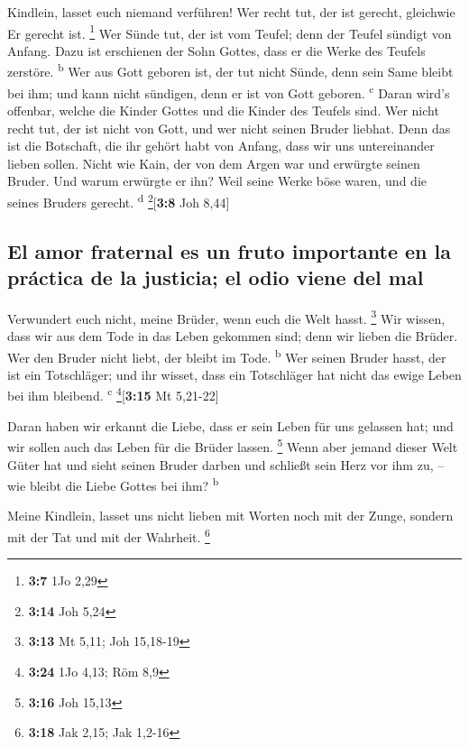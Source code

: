  Kindlein, lasset euch niemand verführen! Wer recht tut,
der ist gerecht, gleichwie Er gerecht ist. \footnote{\textbf{3:7} 1Jo
  2,29}  Wer Sünde tut, der ist vom Teufel; denn der
Teufel sündigt von Anfang. Dazu ist erschienen der Sohn Gottes, dass er
die Werke des Teufels zerstöre. \textsuperscript{b}  Wer
aus Gott geboren ist, der tut nicht Sünde, denn sein Same bleibt bei
ihm; und kann nicht sündigen, denn er ist von Gott geboren.
\textsuperscript{c}  Daran wird's offenbar, welche die
Kinder Gottes und die Kinder des Teufels sind. Wer nicht recht tut, der
ist nicht von Gott, und wer nicht seinen Bruder liebhat. 
Denn das ist die Botschaft, die ihr gehört habt von Anfang, dass wir uns
untereinander lieben sollen.  Nicht wie Kain, der von dem
Argen war und erwürgte seinen Bruder. Und warum erwürgte er ihn? Weil
seine Werke böse waren, und die seines Bruders gerecht.
\textsuperscript{d} \footnote{\textbf{3:14} Joh 5,24}{[}\textbf{3:8} Joh
8,44{]}

\hypertarget{el-amor-fraternal-es-un-fruto-importante-en-la-pruxe1ctica-de-la-justicia-el-odio-viene-del-mal}{%
\subsection{El amor fraternal es un fruto importante en la práctica de
la justicia; el odio viene del
mal}\label{el-amor-fraternal-es-un-fruto-importante-en-la-pruxe1ctica-de-la-justicia-el-odio-viene-del-mal}}

 Verwundert euch nicht, meine Brüder, wenn euch die Welt
hasst. \footnote{\textbf{3:13} Mt 5,11; Joh 15,18-19} 
Wir wissen, dass wir aus dem Tode in das Leben gekommen sind; denn wir
lieben die Brüder. Wer den Bruder nicht liebt, der bleibt im Tode.
\textsuperscript{b}  Wer seinen Bruder hasst, der ist ein
Totschläger; und ihr wisset, dass ein Totschläger hat nicht das ewige
Leben bei ihm bleibend. \textsuperscript{c} \footnote{\textbf{3:24} 1Jo
  4,13; Röm 8,9}{[}\textbf{3:15} Mt 5,21-22{]}

 Daran haben wir erkannt die Liebe, dass er sein Leben
für uns gelassen hat; und wir sollen auch das Leben für die Brüder
lassen. \footnote{\textbf{3:16} Joh 15,13}  Wenn aber
jemand dieser Welt Güter hat und sieht seinen Bruder darben und schließt
sein Herz vor ihm zu, -- wie bleibt die Liebe Gottes bei ihm?
\textsuperscript{b}

 Meine Kindlein, lasset uns nicht lieben mit Worten noch
mit der Zunge, sondern mit der Tat und mit der Wahrheit. \footnote{\textbf{3:18}
  Jak 2,15; Jak 1,2-16}

